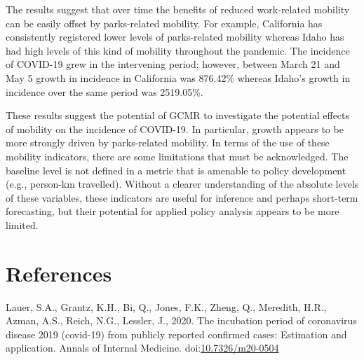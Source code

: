 \documentclass[]{elsarticle} %
\begin{document}
The results suggest that over time the benefits of reduced work-related
mobility can be easily offset by parks-related mobility. For example,
California has consistently registered lower levels of parks-related
mobility whereas Idaho has had high levels of this kind of mobility
throughout the pandemic. The incidence of COVID-19 grew in the
intervening period; however, between March 21 and May 5 growth in
incidence in California was 876.42\% whereas Idaho's growth in incidence
over the same period was 2519.05\%.

These results suggest the potential of GCMR to investigate the potential
effects of mobility on the incidence of COVID-19. In particular, growth
appears to be more strongly driven by parks-related mobility. In terms
of the use of these mobility indicators, there are some limitations that
must be acknowledged. The baseline level is not defined in a metric that
is amenable to policy development (e.g., person-km travelled). Without a
clearer understanding of the absolute levels of these variables, these
indicators are useful for inference and perhaps short-term forecasting,
but their potential for applied policy analysis appears to be more
limited.

\hypertarget{references}{%
\section*{References}\label{references}}

\hypertarget{refs}{}
\leavevmode\hypertarget{ref-Lauer2020incubation}{}%
Lauer, S.A., Grantz, K.H., Bi, Q., Jones, F.K., Zheng, Q., Meredith,
H.R., Azman, A.S., Reich, N.G., Lessler, J., 2020. The incubation period
of coronavirus disease 2019 (covid-19) from publicly reported confirmed
cases: Estimation and application. Annals of Internal Medicine.
doi:\href{https://doi.org/10.7326/m20-0504}{10.7326/m20-0504}
\end{document}
